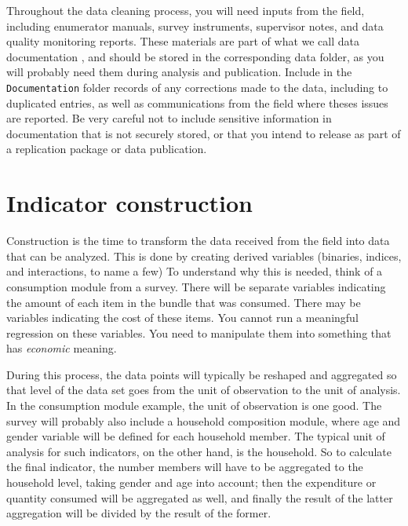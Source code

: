 Throughout the data cleaning process, you will need inputs from the field, 
including enumerator manuals, survey instruments, 
supervisor notes, and data quality monitoring reports.
These materials are part of what we call data documentation
,
and should be stored in the corresponding data folder, 
as you will probably need them during analysis and publication.
Include in the \texttt{Documentation} folder records of any
corrections made to the data, including to duplicated entries,
as well as communications from the field where theses issues are reported.
Be very careful not to include sensitive information in 
documentation that is not securely stored, 
or that you intend to release as part of a replication package or data publication.

\section{Indicator construction}

Construction is the time to transform the data received from the field
into data that can be analyzed.
This is done by creating derived variables
(binaries, indices, and interactions, to name a few)
To understand why this is needed, think of a consumption module from a survey.
There will be separate variables indicating the 
amount of each item in the bundle that was consumed.
There may be variables indicating the cost of these items.
You cannot run a meaningful regression on these variables. 
You need to manipulate them into something that has \textit{economic} meaning. 

During this process, the data points will typically be reshaped and aggregated 
so that level of the data set goes from the unit of observation to the unit of analysis. 
In the consumption module example, the unit of observation is one good. 
The survey will probably also include a household composition module,
where age and gender variable will be defined for each household member.
The typical unit of analysis for such indicators, on the other hand, is the household.
So to calculate the final indicator, 
the number members will have to be aggregated to the household level,
taking gender and age into account;
then the expenditure or quantity consumed will be aggregated as well,
and finally the result of the latter aggregation will be divided by the result of the former.

